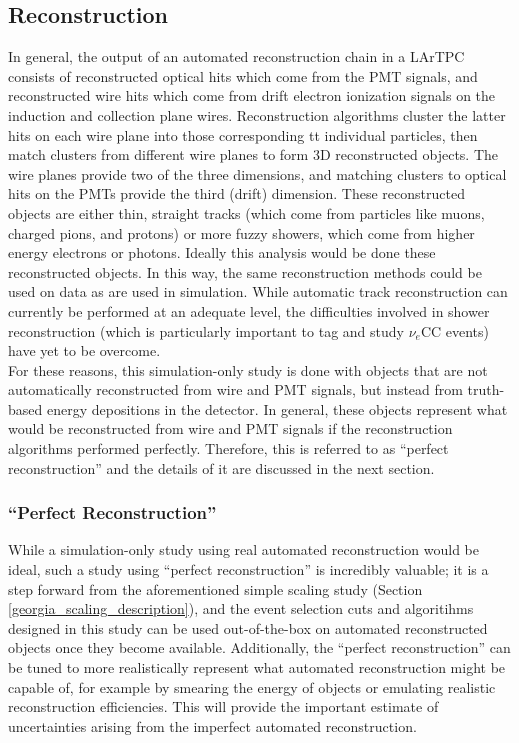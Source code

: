 \subsection{Reconstruction}
In general, the output of an automated reconstruction chain in a LArTPC consists of reconstructed optical hits which come from the PMT signals, and reconstructed wire hits which come from drift electron ionization signals on the induction and collection plane wires. Reconstruction algorithms cluster the latter hits on each wire plane into those corresponding tt individual particles, then match clusters from different wire planes to form 3D reconstructed objects. The wire planes provide two of the three dimensions, and matching clusters to optical hits on the PMTs provide the third (drift) dimension. These reconstructed objects are either thin, straight tracks (which come from particles like muons, charged pions, and protons) or more fuzzy showers, which come from higher energy electrons or photons. Ideally this analysis would be done these reconstructed objects. In this way, the same reconstruction methods could be used on data as are used in simulation. While automatic track reconstruction can currently be performed at an adequate level, the difficulties involved in shower reconstruction (which is particularly important to tag and study $\nu_e$CC events) have yet to be overcome.\\

For these reasons, this simulation-only study is done with objects that are not automatically reconstructed from wire and PMT signals, but instead from truth-based energy depositions in the detector. In general, these objects represent what would be reconstructed from wire and PMT signals if the reconstruction algorithms performed perfectly. Therefore, this is referred to as ``perfect reconstruction'' and the details of it are discussed in the next section. 

\subsubsection{``Perfect Reconstruction''}\label{perfectreco_section}
While a simulation-only study using real automated reconstruction would be ideal, such a study using ``perfect reconstruction'' is incredibly valuable; it is a step forward from the aforementioned simple scaling study (Section \ref{georgia_scaling_description}), and the event selection cuts and algoritihms designed in this study can be used out-of-the-box on automated reconstructed objects once they become available. Additionally, the ``perfect reconstruction'' can be tuned to more realistically represent what automated reconstruction might be capable of, for example by smearing the energy of objects or emulating realistic reconstruction efficiencies. This will provide the important estimate of uncertainties arising from the imperfect automated reconstruction.\\

